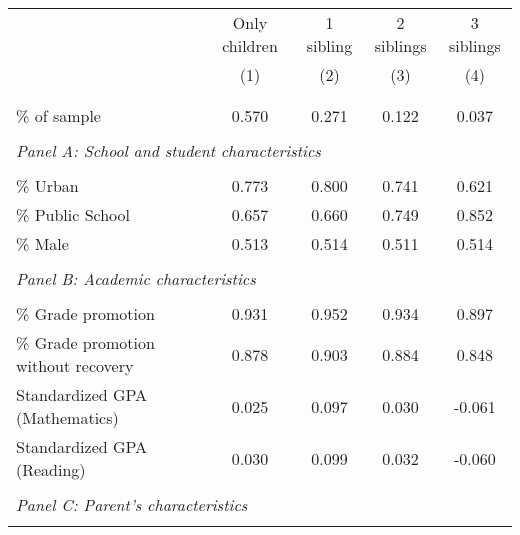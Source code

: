 \makeatletter
{}
{
\makeatother
\begin{tabular}{lcccc}
\toprule
& Only children & 1 sibling & 2 siblings & 3 siblings  \\
\cmidrule(lr){2-2} \cmidrule(lr){3-3} \cmidrule(lr){4-4} \cmidrule(lr){5-5}
& (1) & (2) & (3) & (4)\\
\bottomrule
&  &  &  & \\
            &            &            &            &            \\
\% of sample &       0.570&       0.271&       0.122&       0.037\\
&  &  &   \\
\multicolumn{4}{l}{\textit{Panel A: School and student characteristics}} \\
            &            &            &            &            \\
\% Urban    &       0.773&       0.800&       0.741&       0.621\\
\% Public School&       0.657&       0.660&       0.749&       0.852\\
\% Male     &       0.513&       0.514&       0.511&       0.514\\
&  &  &   \\
\multicolumn{4}{l}{\textit{Panel B: Academic characteristics}} \\
            &            &            &            &            \\
\% Grade promotion&       0.931&       0.952&       0.934&       0.897\\
\% Grade promotion without recovery&       0.878&       0.903&       0.884&       0.848\\
Standardized GPA (Mathematics) &       0.025&       0.097&       0.030&      -0.061\\
Standardized GPA (Reading)&       0.030&       0.099&       0.032&      -0.060\\
&  &  &   \\
\multicolumn{4}{l}{\textit{Panel C: Parent's characteristics}} \\
            &            &            &            &            \\

\end{tabular}}
